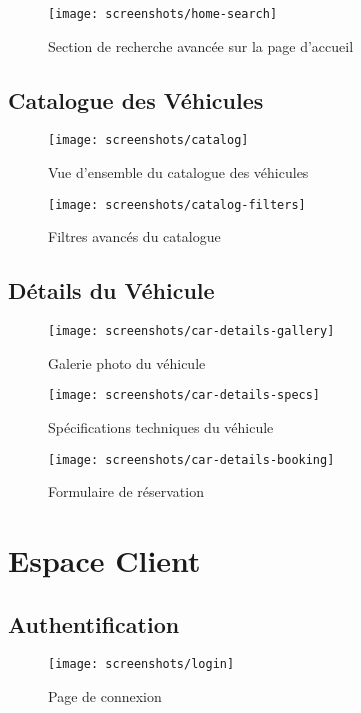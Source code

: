 \documentclass[12pt,a4paper]{report}
\begin{document}
\begin{figure}[H]
    \centering
    \texttt{[image: screenshots/home-search]}
    \caption{Section de recherche avancée sur la page d'accueil}
\end{figure}

\subsection{Catalogue des Véhicules}
\begin{figure}[H]
    \centering
    \texttt{[image: screenshots/catalog]}
    \caption{Vue d'ensemble du catalogue des véhicules}
\end{figure}

\begin{figure}[H]
    \centering
    \texttt{[image: screenshots/catalog-filters]}
    \caption{Filtres avancés du catalogue}
\end{figure}

\subsection{Détails du Véhicule}
\begin{figure}[H]
    \centering
    \texttt{[image: screenshots/car-details-gallery]}
    \caption{Galerie photo du véhicule}
\end{figure}

\begin{figure}[H]
    \centering
    \texttt{[image: screenshots/car-details-specs]}
    \caption{Spécifications techniques du véhicule}
\end{figure}

\begin{figure}[H]
    \centering
    \texttt{[image: screenshots/car-details-booking]}
    \caption{Formulaire de réservation}
\end{figure}

\section{Espace Client}

\subsection{Authentification}
\begin{figure}[H]
    \centering
    \texttt{[image: screenshots/login]}
    \caption{Page de connexion}
\end{figure}
\end{document}
